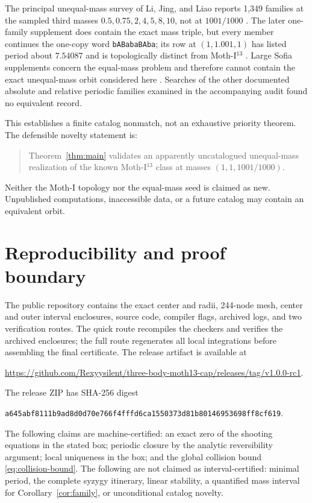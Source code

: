\documentclass[11pt]{article}
\begin{document}
The principal unequal-mass survey of Li, Jing, and Liao reports 1,349 families at the sampled third masses $0.5,0.75,2,4,5,8,10$, not at $1001/1000$ \cite{li-jing-liao-2018}. The later one-family supplement does contain the exact mass triple, but every member continues the one-copy word \texttt{bABabaBAba}; its row at $(1,1.001,1)$ has listed period about $7.54087$ and is topologically distinct from Moth-I$^{13}$ \cite{li-li-liao-2021}. Large Sofia supplements concern the equal-mass problem and therefore cannot contain the exact unequal-mass orbit considered here \cite{hristov-2025}. Searches of the other documented absolute and relative periodic families examined in the accompanying audit found no equivalent record.

This establishes a finite catalog nonmatch, not an exhaustive priority theorem. The defensible novelty statement is:
\begin{quote}
  Theorem~\ref{thm:main} validates an apparently uncatalogued unequal-mass realization of the known Moth-I$^{13}$ class at masses $(1,1,1001/1000)$.
\end{quote}
Neither the Moth-I topology nor the equal-mass seed is claimed as new. Unpublished computations, inaccessible data, or a future catalog may contain an equivalent orbit.

\section{Reproducibility and proof boundary}

The public repository contains the exact center and radii, 244-node mesh, center and outer interval enclosures, source code, compiler flags, archived logs, and two verification routes. The quick route recompiles the checkers and verifies the archived enclosures; the full route regenerates all local integrations before assembling the final certificate. The release artifact is available at
\begin{center}
\url{https://github.com/Rexyysilent/three-body-moth13-cap/releases/tag/v1.0.0-rc1}.
\end{center}
The release ZIP has SHA-256 digest
\begin{center}
\texttt{a645abf8111b9ad8d0d70e766f4fffd6ca1550373d81b80146953698ff8cf619}.
\end{center}

The following claims are machine-certified: an exact zero of the shooting equations in the stated box; periodic closure by the analytic reversibility argument; local uniqueness in the box; and the global collision bound \eqref{eq:collision-bound}. The following are not claimed as interval-certified: minimal period, the complete syzygy itinerary, linear stability, a quantified mass interval for Corollary~\ref{cor:family}, or unconditional catalog novelty.
\end{document}
